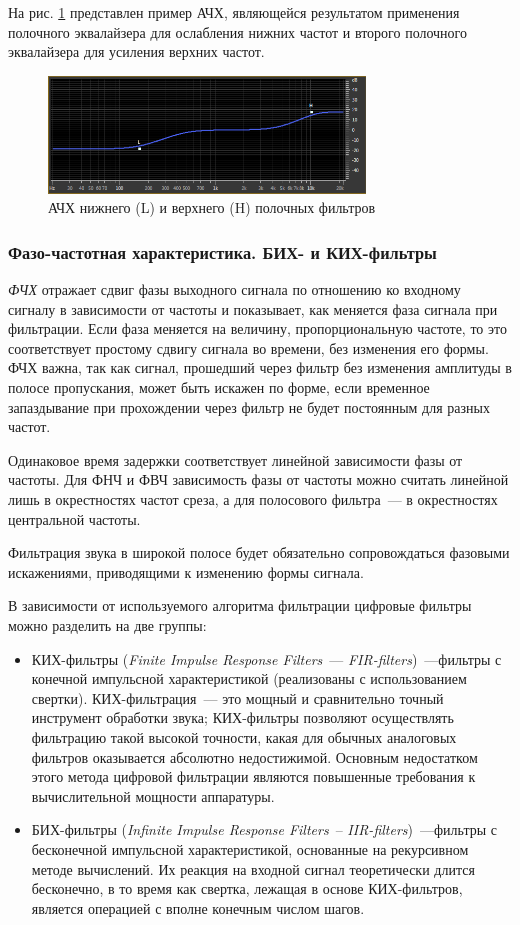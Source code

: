 \documentclass[oneside, final, 14pt]{extreport}
\begin{document}
На рис. \ref{pic-shelving-01} представлен пример АЧХ, являющейся результатом применения полочного эквалайзера для ослабления нижних частот и второго полочного эквалайзера для усиления верхних частот.

\begin{figure}[h]
  \centering
  \includegraphics[width=0.75\textwidth]{pic-shelving-01}
  \caption{АЧХ нижнего (L) и верхнего (H) полочных фильтров}
  \label{pic-shelving-01}
\end{figure}

\subsubsection{Фазо-частотная характеристика. БИХ- и КИХ-фильтры}
\emph{ФЧХ} отражает сдвиг фазы выходного сигнала по отношению ко входному сигналу в зависимости от частоты и показывает, как меняется фаза сигнала при фильтрации. Если фаза меняется на величину, пропорциональную частоте, то это соответствует простому сдвигу сигнала во времени, без изменения его формы. ФЧХ важна, так как сигнал, прошедший через фильтр без изменения амплитуды в полосе пропускания, может быть искажен по форме, если временное запаздывание при прохождении через фильтр не будет постоянным для разных частот.

Одинаковое время задержки соответствует линейной зависимости фазы от частоты. Для ФНЧ и ФВЧ зависимость фазы от частоты можно считать линейной лишь в окрестностях частот среза, а для полосового фильтра~--- в окрестностях центральной частоты.

Фильтрация звука в широкой полосе будет обязательно сопровождаться фазовыми искажениями, приводящими к изменению формы сигнала.

В зависимости от используемого алгоритма фильтрации цифровые фильтры можно разделить на две группы:
\begin{itemize}
  \item КИХ-фильтры (\emph{Finite Impulse Response Filters}~--- \emph{FIR-filters})~---фильтры с конечной импульсной характеристикой (реализованы с использованием свертки). КИХ-фильтрация~--- это мощный и сравнительно точный инструмент обработки звука; КИХ-фильтры позволяют осуществлять фильтрацию такой высокой точности, какая для обычных аналоговых фильтров оказывается абсолютно недостижимой. Основным недостатком этого метода цифровой фильтрации являются повышенные требования к вычислительной мощности аппаратуры.
  \item БИХ-фильтры (\emph{Infinite Impulse Response Filters}~-- \emph{IIR-filters})~---фильтры с бесконечной импульсной характеристикой, основанные на рекурсивном методе вычислений. Их реакция на входной сигнал теоретически длится бесконечно, в то время как свертка, лежащая в основе КИХ-фильтров, является операцией с вполне конечным числом шагов.
\end{itemize}
\end{document}

